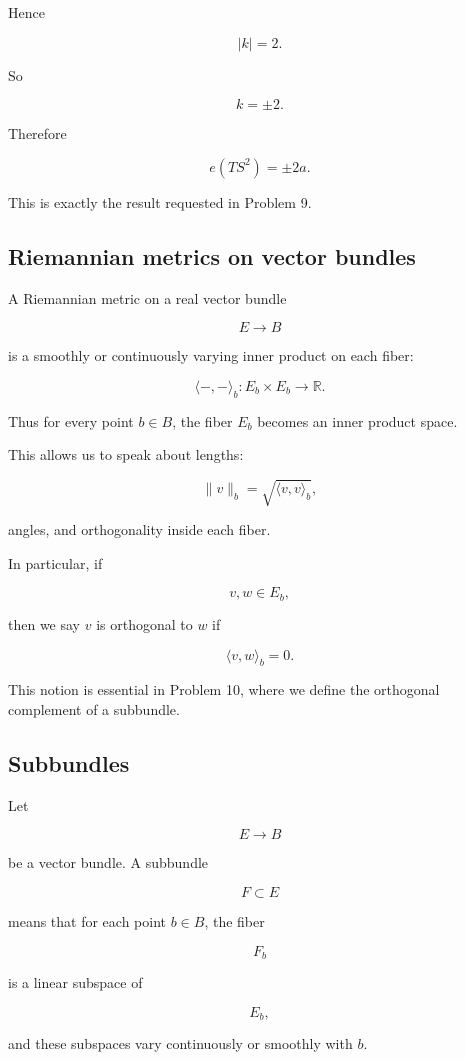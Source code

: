 \documentclass[12pt,a4paper]{article}
\newcommand{\R}{\mathbb{R}}
\theoremstyle{notespace}
\begin{document}
	Hence
	
	\[
	|k|=2.
	\]
	
	So
	
	\[
	k=\pm 2.
	\]
	
	Therefore
	
	\[
	\boxed{
		e(TS^{2})=\pm 2a.
	}
	\]
	
	This is exactly the result requested in Problem 9.
	
	\subsection{Riemannian metrics on vector bundles}
	
	A Riemannian metric on a real vector bundle
	
	\[
	E\to B
	\]
	
	is a smoothly or continuously varying inner product on each fiber:
	
	\[
	\langle -,-\rangle_b:E_b\times E_b\to \R.
	\]
	
	Thus for every point \(b\in B\), the fiber \(E_b\) becomes an inner product space.
	
	This allows us to speak about lengths:
	
	\[
	\|v\|_b=\sqrt{\langle v,v\rangle_b},
	\]
	
	angles, and orthogonality inside each fiber.
	
	In particular, if
	
	\[
	v,w\in E_b,
	\]
	
	then we say \(v\) is orthogonal to \(w\) if
	
	\[
	\langle v,w\rangle_b=0.
	\]
	
	This notion is essential in Problem 10, where we define the orthogonal complement of a subbundle.
	
	\subsection{Subbundles}
	
	Let
	
	\[
	E\to B
	\]
	
	be a vector bundle. A subbundle
	
	\[
	F\subset E
	\]
	
	means that for each point \(b\in B\), the fiber
	
	\[
	F_b
	\]
	
	is a linear subspace of
	
	\[
	E_b,
	\]
	
	and these subspaces vary continuously or smoothly with \(b\).
	
\end{document}
